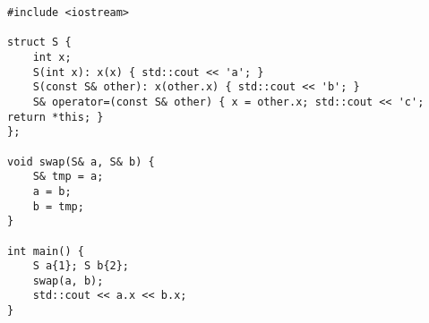 \begin{lstlisting}[title=\href{https://godbolt.org/z/HV5Y4B}{\texttt{godbolt.org/z/HV5Y4B}}]
#include <iostream>

struct S { 
    int x;
    S(int x): x(x) { std::cout << 'a'; }
    S(const S& other): x(other.x) { std::cout << 'b'; }
    S& operator=(const S& other) { x = other.x; std::cout << 'c'; return *this; }
};

void swap(S& a, S& b) {
    S& tmp = a;
    a = b;
    b = tmp;
}

int main() {
    S a{1}; S b{2};
    swap(a, b);
    std::cout << a.x << b.x;
}
\end{lstlisting}
